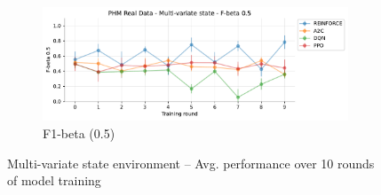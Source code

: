 \documentclass[a4paper, 12pt]{article}
\begin{document}
\begin{figure}[ht]
	\begin{subfigure}{\textwidth}
		\centering
		\includegraphics[width=\linewidth]{Multivariate_F05.pdf}  
		\caption{F1-beta (0.5)}
		\label{fig:tr-ms-f05}
	\end{subfigure}
	\caption{Multi-variate state environment -- Avg. performance over 10 rounds of model training}
	\label{fig:tr-ms-env}
\end{figure}
\end{document}
